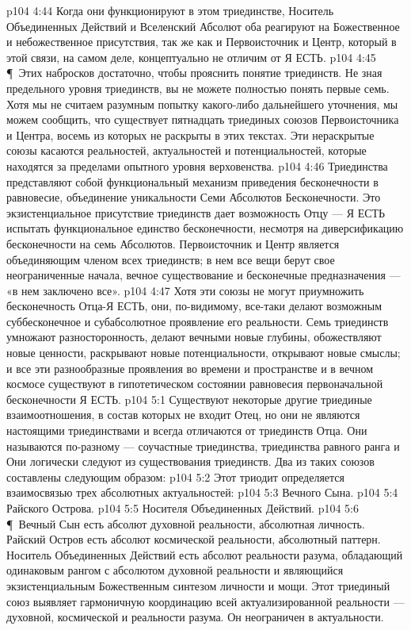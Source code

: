 \vs p104 4:44 Когда они функционируют в этом триединстве, Носитель Объединенных Действий и Вселенский Абсолют оба реагируют на Божественное и небожественное присутствия, так же как и Первоисточник и Центр, который в этой связи, на самом деле, концептуально не отличим от Я ЕСТЬ.
\vs p104 4:45 \P\ Этих набросков достаточно, чтобы прояснить понятие триединств. Не зная предельного уровня триединств, вы не можете полностью понять первые семь. Хотя мы не считаем разумным попытку какого\hyp{}либо дальнейшего уточнения, мы можем сообщить, что существует пятнадцать триединых союзов Первоисточника и Центра, восемь из которых не раскрыты в этих текстах. Эти нераскрытые союзы касаются реальностей, актуальностей и потенциальностей, которые находятся за пределами опытного уровня верховенства.
\vs p104 4:46 Триединства представляют собой функциональный механизм приведения бесконечности в равновесие, объединение уникальности Семи Абсолютов Бесконечности. Это экзистенциальное присутствие триединств дает возможность Отцу --- Я ЕСТЬ испытать функциональное единство бесконечности, несмотря на диверсификацию бесконечности на семь Абсолютов. Первоисточник и Центр является объединяющим членом всех триединств; в нем все вещи берут свое неограниченные начала, вечное существование и бесконечные предназначения --- «в нем заключено все».
\vs p104 4:47 Хотя эти союзы не могут приумножить бесконечность Отца\hyp{}Я ЕСТЬ, они, по\hyp{}видимому, все\hyp{}таки делают возможным суббесконечное и субабсолютное проявление его реальности. Семь триединств умножают разносторонность, делают вечными новые глубины, обожествляют новые ценности, раскрывают новые потенциальности, открывают новые смыслы; и все эти разнообразные проявления во времени и пространстве и в вечном космосе существуют в гипотетическом состоянии равновесия первоначальной бесконечности Я ЕСТЬ.
\vs p104 5:1 Существуют некоторые другие триединые взаимоотношения, в состав которых не входит Отец, но они не являются настоящими триединствами и всегда отличаются от триединств Отца. Они называются по\hyp{}разному --- соучастные триединства, триединства равного ранга и  Они логически следуют из существования триединств. Два из таких союзов составлены следующим образом:
\vs p104 5:2  Этот триодит определяется взаимосвязью трех абсолютных актуальностей:
\vs p104 5:3 \bibnobreakspace Вечного Сына.
\vs p104 5:4 \bibnobreakspace Райского Острова.
\vs p104 5:5 \bibnobreakspace Носителя Объединенных Действий.
\vs p104 5:6 \P\ Вечный Сын есть абсолют духовной реальности, абсолютная личность. Райский Остров есть абсолют космической реальности, абсолютный паттерн. Носитель Объединенных Действий есть абсолют реальности разума, обладающий одинаковым рангом с абсолютом духовной реальности и являющийся экзистенциальным Божественным синтезом личности и мощи. Этот триединый союз выявляет гармоничную координацию всей актуализированной реальности --- духовной, космической и реальности разума. Он неограничен в актуальности.
